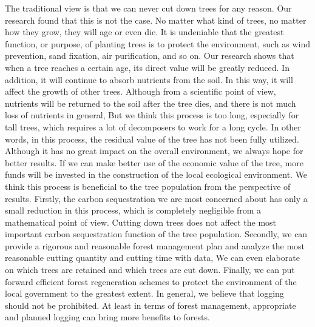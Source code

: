 \documentclass[12pt]{article}
\begin{document}
The traditional view is that we can never cut down trees for any reason. Our
research found that this is not the case. No matter what kind of trees, no
matter how they grow, they will age or even die. It is undeniable that the
greatest function, or purpose, of planting trees is to protect the environment,
such as wind prevention, sand fixation, air purification, and so on. Our
research shows that when a tree reaches a certain age, its direct value will be
greatly reduced. In addition, it will continue to absorb nutrients from the
soil. In this way, it will affect the growth of other trees. Although from a
scientific point of view, nutrients will be returned to the soil after the tree
dies, and there is not much loss of nutrients in general, But we think this
process is too long, especially for tall trees, which requires a lot of
decomposers to work for a long cycle. In other words, in this process, the
residual value of the tree has not been fully utilized. Although it has no
great impact on the overall environment, we always hope for better results. If
we can make better use of the economic value of the tree, more funds will be
invested in the construction of the local ecological environment. We think this
process is beneficial to the tree population from the perspective of results.
Firstly, the carbon sequestration we are most concerned about has only a small
reduction in this process, which is completely negligible from a mathematical
point of view. Cutting down trees does not affect the most important carbon
sequestration function of the tree population. Secondly, we can provide a
rigorous and reasonable forest management plan and analyze the most reasonable
cutting quantity and cutting time with data, We can even elaborate on which
trees are retained and which trees are cut down. Finally, we can put forward
efficient forest regeneration schemes to protect the environment of the local
government to the greatest extent. In general, we believe that logging should
not be prohibited. At least in terms of forest management, appropriate and
planned logging can bring more benefits to forests.
\end{document}
